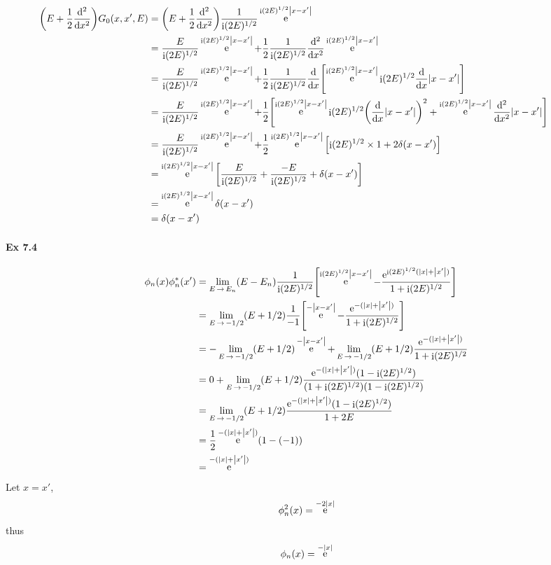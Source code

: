 \documentclass[a4paper]{article}
\DeclareMathOperator{\e}{\mathrm{e}}
\DeclareMathOperator{\I}{\mathrm{i}}
\DeclareMathOperator{\ra}{\rightarrow}
\newcommand{\ex}[1]{\paragraph{Ex #1}}
\numberwithin{equation}{subsection}
\begin{document}
\begin{equation}\label{key}
\hskip-1cm
\begin{aligned}
\qty(E + \dfrac{1}{2}\dv[2]{x}) G_0(x,x',E) 
&= \qty(E + \dfrac{1}{2}\dv[2]{x}) \dfrac{1}{\I(2E)^{1/2}} \e^{\I(2E)^{1/2}\abs{x-x'}} \\
&=  \dfrac{E}{\I(2E)^{1/2}} \e^{\I(2E)^{1/2}\abs{x-x'}} +  \dfrac{1}{2}\dfrac{1}{\I(2E)^{1/2}} \dv[2]{x} \e^{\I(2E)^{1/2}\abs{x-x'}} \\
&= \dfrac{E}{\I(2E)^{1/2}} \e^{\I(2E)^{1/2}\abs{x-x'}} +  \dfrac{1}{2}\dfrac{1}{\I(2E)^{1/2}} \dv{x} \qty [\e^{\I(2E)^{1/2}\abs{x-x'}} \I(2E)^{1/2}\dv{x}\abs{x-x'} ] \\
&= \dfrac{E}{\I(2E)^{1/2}} \e^{\I(2E)^{1/2}\abs{x-x'}} 
+ \dfrac{1}{2} 
\qty [\e^{\I(2E)^{1/2}\abs{x-x'}}\I(2E)^{1/2} \qty(\dv{x}\abs{x-x'} )^2
+ \e^{\I(2E)^{1/2}\abs{x-x'}} \dv[2]{x}\abs{x-x'}] \\
&= \dfrac{E}{\I(2E)^{1/2}} \e^{\I(2E)^{1/2}\abs{x-x'}} 
+ \dfrac{1}{2} \e^{\I(2E)^{1/2}\abs{x-x'}}
\qty [\I(2E)^{1/2} \times 1
+ 2\delta(x-x')] \\
&= \e^{\I(2E)^{1/2}\abs{x-x'}}
\qty [\dfrac{E}{\I(2E)^{1/2}} + \dfrac{-E}{\I(2E)^{1/2}} + \delta(x-x')] \\
&= \e^{\I(2E)^{1/2}\abs{x-x'}} \delta(x-x') \\
&= \delta(x-x') 
\end{aligned}
\end{equation}

\ex{7.4}
\begin{align}
\phi_n(x)\phi_n^*(x') &= \lim_{E\ra E_n} (E - E_n) \dfrac{1}{\I(2E)^{1/2}} \qty[\e^{\I(2E)^{1/2}\abs{x-x'}} 
- \dfrac{\e^{\I(2E)^{1/2}(\abs{x} + \abs{x'})}}{1 + \I(2E)^{1/2}}] \notag\\
&= \lim_{E\ra -1/2} (E + 1/2) \dfrac{1}{-1} \qty[\e^{-\abs{x-x'}} 
- \dfrac{\e^{-(\abs{x} + \abs{x'})}}{1 + \I(2E)^{1/2}}] \notag\\
&= -\lim_{E\ra -1/2} (E + 1/2) \e^{-\abs{x-x'}} 
+ \lim_{E\ra -1/2}(E + 1/2)\dfrac{\e^{-(\abs{x} + \abs{x'})}}{1 + \I(2E)^{1/2}} \notag\\
&= 0 + \lim_{E\ra -1/2}(E + 1/2)\dfrac{\e^{-(\abs{x} + \abs{x'})}(1 - \I(2E)^{1/2})}{(1 + \I(2E)^{1/2})(1 - \I(2E)^{1/2})} \notag\\
&= \lim_{E\ra -1/2}(E + 1/2)\dfrac{\e^{-(\abs{x} + \abs{x'})}(1 - \I(2E)^{1/2})}{1 + 2E} \notag\\
&= \dfrac{1}{2}\e^{-(\abs{x} + \abs{x'})}(1 - (-1)) \notag\\
&= \e^{-(\abs{x} + \abs{x'})}
\end{align}
Let $ x=x' $,
\begin{equation}\label{key}
\phi_n^2(x) = \e^{-2\abs{x}}
\end{equation}
thus
\begin{equation}\label{key}
\phi_n(x) = \e^{-\abs{x}}
\end{equation}
\end{document}
